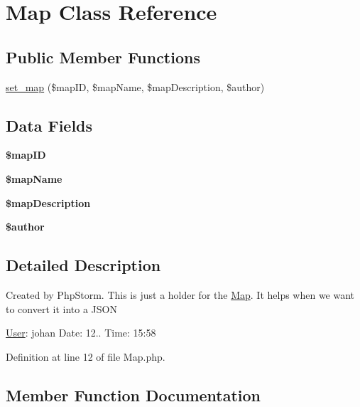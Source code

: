 \hypertarget{class_map}{}\section{Map Class Reference}
\label{class_map}
\subsection*{Public Member Functions}
\begin{DoxyCompactItemize}
\item 
\hyperlink{class_map_a9fe8c6be6b6ef95747e4eb3ab49c2c10}{set\+\_\+map} (\$map\+ID, \$map\+Name, \$map\+Description, \$author)
\end{DoxyCompactItemize}
\subsection*{Data Fields}
\begin{DoxyCompactItemize}
\item 
\mbox{\label{class_map_ace12b3203ac5df07d868adda1786188e}} 
{\bfseries \$map\+ID}
\item 
\mbox{\label{class_map_a5d5eba19afce030ab95fc126746396b4}} 
{\bfseries \$map\+Name}
\item 
\mbox{\label{class_map_a9eefab63676fcdc4712153055d66c7a3}} 
{\bfseries \$map\+Description}
\item 
\mbox{\label{class_map_ac35b828f7d4064a7c9f849c255468ee3}} 
{\bfseries \$author}
\end{DoxyCompactItemize}


\subsection{Detailed Description}
Created by Php\+Storm. This is just a holder for the \hyperlink{class_map}{Map}. It helps when we want to convert it into a J\+S\+ON

\hyperlink{class_user}{User}\+: johan Date\+: 12.. Time\+: 15\+:58 

Definition at line 12 of file Map.\+php.



\subsection{Member Function Documentation}
\mbox{\label{class_map_a9fe8c6be6b6ef95747e4eb3ab49c2c10}} 
